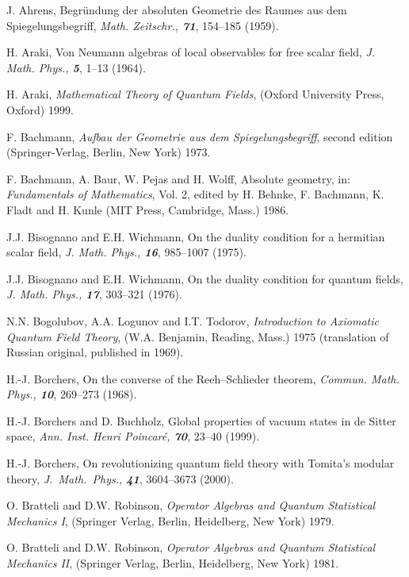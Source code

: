 \documentclass[12pt]{article}
\begin{document}
\begin{thebibliography}{Bor}
\footnotesize

J. Ahrens, Begr\"undung der absoluten Geometrie des Raumes aus dem
Spiegelungsbegriff, {\sl Math. Zeitschr., \bf 71}, 154--185 (1959).

H. Araki, Von Neumann algebras of local observables for free scalar
field, {\sl J. Math. Phys., \bf 5}, 1--13 (1964).

H. Araki, {\it Mathematical Theory of Quantum Fields}, (Oxford 
University Press, Oxford) 1999.

F. Bachmann, {\it Aufbau der Geometrie aus dem Spiegelungsbegriff},
second edition (Springer-Verlag, Berlin, New York) 1973.

F. Bachmann, A. Baur, W. Pejas and H. Wolff, Absolute
geometry, in: {\it Fundamentals of Mathematics}, Vol. 2, edited by
H. Behnke, F. Bachmann, K. Fladt and H. Kunle (MIT Press, Cambridge, Mass.) 
1986.

J.J. Bisognano and E.H. Wichmann, On the duality condition for a 
hermitian scalar field, {\sl J. Math. Phys., \bf 16}, 985--1007 (1975).

J.J. Bisognano and E.H. Wichmann, On the duality condition for 
quantum fields, {\sl J. Math. Phys., \bf 17}, 303--321 (1976).

N.N. Bogolubov, A.A. Logunov and I.T. Todorov, {\it Introduction to 
Axiomatic Quantum Field Theory}, (W.A. Benjamin, Reading, Mass.) 1975
(translation of Russian original, published in 1969).

H.-J. Borchers, On the converse of the Reeh--Schlieder theorem, {\sl
Commun. Math. Phys., \bf 10}, 269--273 (1968).

H.-J. Borchers and D. Buchholz, Global properties of vacuum states
in de Sitter space, {\sl Ann. Inst. Henri Poincar\'e, \bf 70}, 23--40 
(1999).

H.-J. Borchers, On revolutionizing quantum field theory with Tomita's
modular theory, {\sl J.\ Math.\ Phys., \bf 41}, 3604--3673 (2000).

O. Bratteli and D.W. Robinson, {\it Operator Algebras and
Quantum Statistical Mechanics I}, (Springer Verlag, Berlin, Heidelberg, 
New York) 1979. 

O. Bratteli and D.W. Robinson, {\it Operator Algebras
and Quantum Statistical Mechanics II}, (Springer Verlag, Berlin,
Heidelberg, New York) 1981.


\end{thebibliography}
\end{document}
